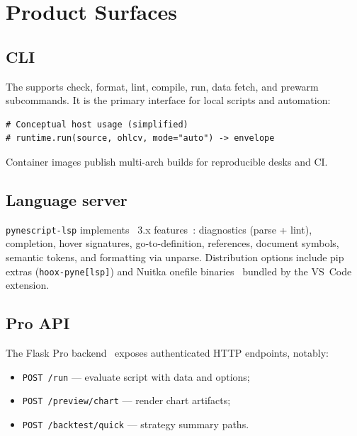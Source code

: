 \documentclass[11pt,a4paper]{article}
\begin{document}
\section{Product Surfaces}
\label{sec:surfaces}

\subsection{CLI}
\label{sec:cli}

The  \cli{} supports check, format, lint, compile, run, data
fetch, and prewarm subcommands.
It is the primary interface for local scripts and automation:

\begin{lstlisting}[style=python,caption={Programmatic evaluation sketch.},label={lst:eval-api}]
# Conceptual host usage (simplified)
# runtime.run(source, ohlcv, mode="auto") -> envelope
\end{lstlisting}

Container images publish multi-arch \cli{} builds for reproducible desks and
CI.

\subsection{Language server}
\label{sec:lsp-surface}

\texttt{pynescript-lsp} implements \lsp{}~3.x features~\citep{lsp2023}:
diagnostics (parse + lint), completion, hover signatures, go-to-definition,
references, document symbols, semantic tokens, and formatting via unparse.
Distribution options include pip extras (\texttt{hoox-pyne[lsp]}) and Nuitka
onefile binaries~\citep{nuitka} bundled by the VS~Code extension.

\subsection{Pro API}
\label{sec:pro-api}

The Flask Pro backend~\citep{flask} exposes authenticated HTTP endpoints,
notably:

\begin{itemize}[leftmargin=1.2em]
  \item \texttt{POST /run} --- evaluate script with data and options;
  \item \texttt{POST /preview/chart} --- render chart artifacts;
  \item \texttt{POST /backtest/quick} --- strategy summary paths.
\end{itemize}
\end{document}
